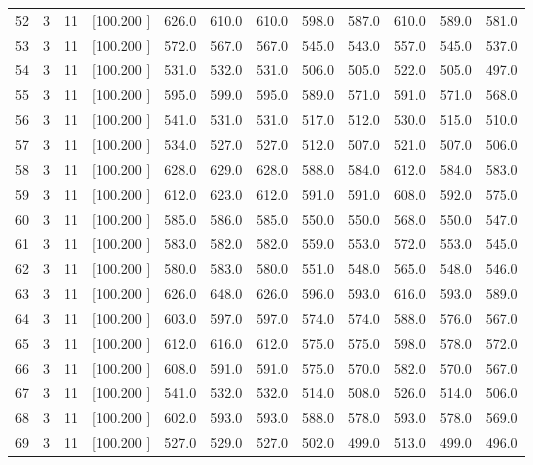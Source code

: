 \documentclass[12pt,a4paper]{article}
\begin{document}
\begin{center}
{\begin{tabular}{r r r r r r r r r r r r}
  52&  3& 11&[100.200   ]&   626.0&   610.0&   610.0&   598.0&   587.0&   610.0&   589.0&   581.0\\[-0.02in]
  53&  3& 11&[100.200   ]&   572.0&   567.0&   567.0&   545.0&   543.0&   557.0&   545.0&   537.0\\[-0.02in]
  54&  3& 11&[100.200   ]&   531.0&   532.0&   531.0&   506.0&   505.0&   522.0&   505.0&   497.0\\[-0.02in]
  55&  3& 11&[100.200   ]&   595.0&   599.0&   595.0&   589.0&   571.0&   591.0&   571.0&   568.0\\[-0.02in]
  56&  3& 11&[100.200   ]&   541.0&   531.0&   531.0&   517.0&   512.0&   530.0&   515.0&   510.0\\[-0.02in]
  57&  3& 11&[100.200   ]&   534.0&   527.0&   527.0&   512.0&   507.0&   521.0&   507.0&   506.0\\[-0.02in]
  58&  3& 11&[100.200   ]&   628.0&   629.0&   628.0&   588.0&   584.0&   612.0&   584.0&   583.0\\[-0.02in]
  59&  3& 11&[100.200   ]&   612.0&   623.0&   612.0&   591.0&   591.0&   608.0&   592.0&   575.0\\[-0.02in]
  60&  3& 11&[100.200   ]&   585.0&   586.0&   585.0&   550.0&   550.0&   568.0&   550.0&   547.0\\[-0.02in]
  61&  3& 11&[100.200   ]&   583.0&   582.0&   582.0&   559.0&   553.0&   572.0&   553.0&   545.0\\[-0.02in]
  62&  3& 11&[100.200   ]&   580.0&   583.0&   580.0&   551.0&   548.0&   565.0&   548.0&   546.0\\[-0.02in]
  63&  3& 11&[100.200   ]&   626.0&   648.0&   626.0&   596.0&   593.0&   616.0&   593.0&   589.0\\[-0.02in]
  64&  3& 11&[100.200   ]&   603.0&   597.0&   597.0&   574.0&   574.0&   588.0&   576.0&   567.0\\[-0.02in]
  65&  3& 11&[100.200   ]&   612.0&   616.0&   612.0&   575.0&   575.0&   598.0&   578.0&   572.0\\[-0.02in]
  66&  3& 11&[100.200   ]&   608.0&   591.0&   591.0&   575.0&   570.0&   582.0&   570.0&   567.0\\[-0.02in]
  67&  3& 11&[100.200   ]&   541.0&   532.0&   532.0&   514.0&   508.0&   526.0&   514.0&   506.0\\[-0.02in]
  68&  3& 11&[100.200   ]&   602.0&   593.0&   593.0&   588.0&   578.0&   593.0&   578.0&   569.0\\[-0.02in]
  69&  3& 11&[100.200   ]&   527.0&   529.0&   527.0&   502.0&   499.0&   513.0&   499.0&   496.0\\[-0.02in]

\end{tabular}}
\end{center}
\end{document}
